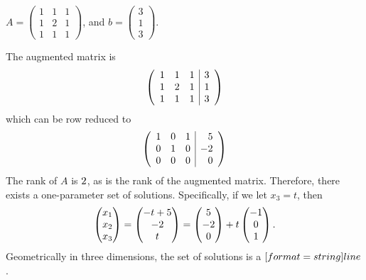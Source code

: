 \documentclass{ximera}
\begin{document}
\begin{exercise}
\item $A = \begin{pmatrix}1 & 1 & 1\\ 1 & 2 & 1 \\ 1 & 1 & 1\end{pmatrix}$, 
and $b = \begin{pmatrix}3 \\ 1 \\ 3\end{pmatrix}$.  

\begin{multipleChoice}
\end{multipleChoice}

\begin{problem}
\soln
The augmented matrix is 
\[
\left(\begin{array}{rrr|r} 
  1 & 1 & 1 & {3} \\ 
  1 & 2 & 1 & {1} \\
  1 & 1 & 1 & {3} \end{array} \right)
  \]
which can be row reduced to
\[
\left(\begin{array}{rrr|r} 
  1 & 0 & {1} & {5} \\ 
  0 & 1 & {0} & {-2} \\
  0 & 0 & 0 & {0} \end{array} \right)
  \]
The rank of $A$ is ${2}$, as is the rank of the augmented matrix.  Therefore, there exists a one-parameter set of solutions.  Specifically, if we let $x_3=t$, then 
\[
\begin{pmatrix}x_1 \\ x_2 \\ x_3\end{pmatrix} =
\begin{pmatrix}{-t+5} \\ {-2} \\ {t}\end{pmatrix} =
\begin{pmatrix}{5} \\ {-2} \\ {0}\end{pmatrix} + t\begin{pmatrix} {-1} \\ {0} \\ {1}\end{pmatrix}. 
\]
Geometrically in three dimensions, the set of solutions is a $[format=string]{line}$.   
\end{problem}
\end{exercise}
\end{document}
